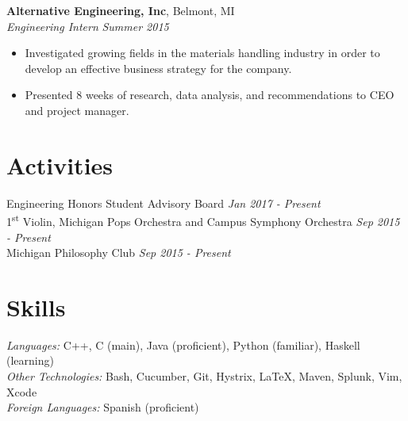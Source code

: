 \documentclass[margin,line]{resume}
\begin{document}
\begin{resume}
    \vspace{-2.5mm}
    \textbf{Alternative Engineering, Inc}, Belmont, MI \\\vspace{1mm}%
    \textsl{Engineering Intern} \hfill \textsl{Summer 2015}
    \begin{itemize}
    \item Investigated growing fields in the materials handling industry in order to develop an effective business strategy for the company. 
    \item Presented 8 weeks of research, data analysis, and recommendations to CEO and project manager.
    \end{itemize}
    \vspace{2.5mm}

   \sectionbreak
   \vspace{-2.5mm}
   \section{\mysidestyle Activities}
   \begin{flushright}
   \vspace{-7.5mm}
    Engineering Honors Student Advisory Board	\hfill  \textsl{Jan 2017 - Present} \\
    1\textsuperscript{st} Violin, Michigan Pops Orchestra and Campus Symphony Orchestra \hfill \textsl{Sep 2015 - Present}
    \\Michigan Philosophy Club \hfill \textsl{Sep 2015 - Present}
    \end{flushright}
    \vspace{-1.5mm}
    
    \sectionbreak
    \vspace{-2.5mm}
    \section{\mysidestyle Skills}
    \emph{Languages:} C++, C (main), Java (proficient), Python (familiar), Haskell (learning) \\
    \emph{Other Technologies:} Bash, Cucumber, Git, Hystrix, \LaTeX, Maven, Splunk, Vim, Xcode \\
    \emph{Foreign Languages:} Spanish (proficient)
\end{resume}
\end{document}
